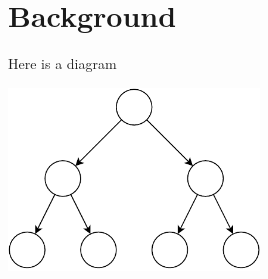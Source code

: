 \section{Background}
Here is a diagram
\begin{center}
    \includegraphics[width=0.5\textwidth]{resources/example-figure.pdf}
\end{center}